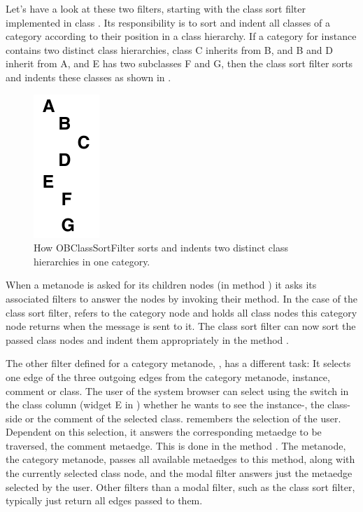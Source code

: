 \documentclass[a4paper,10pt,twoside]{book}
\begin{document}
Let's have a look at these two filters, starting with the class sort filter implemented in class . Its responsibility is to sort and indent all classes of a category according to their position in a class hierarchy. If a category for instance contains two distinct class hierarchies, \eg class C inherits from B, and B and D inherit from A, and E has two subclasses F and G, then the class sort filter sorts and indents these classes as shown in .

\begin{figure}[!ht]
\begin{center}
\includegraphics[scale=1]{classSortFilter.pdf}
\caption{How OBClassSortFilter sorts and indents two distinct class hierarchies in one category.} 
\end{center}
\end{figure}

When a metanode is asked for its children nodes (in method ) it asks its associated filters to answer the nodes by invoking their  method. In the case of the class sort filter,  refers to the category node and  holds all class nodes this category node returns when the message  is sent to it. The class sort filter can now sort the passed class nodes and indent them appropriately in the method .

The other filter defined for a category metanode, , has a different task: It selects one edge of the three outgoing edges from the category metanode, \ie instance, comment or class.  The user of the system browser can select using the switch in the class column (widget E in ) whether he wants to see the instance-, the class-side or the comment of the selected class.  remembers the selection of the user. Dependent on this selection, it answers the corresponding metaedge to be traversed, \eg the comment metaedge. This is done in the method . The metanode, \ie the category metanode, passes all available metaedges to this method, along with the currently selected class node, and the modal filter answers just the metaedge selected by the user. Other filters than a modal filter, such as the class sort filter, typically just return all edges passed to them.
\end{document}
